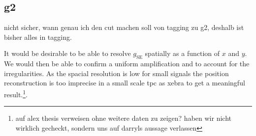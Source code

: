 
\FloatBarrier
\subsection{g2}
\label{ssec:g2}
\FloatBarrier

nicht sicher, wann genau ich den cut machen soll von tagging zu g2, deshalb ist bisher alles in tagging.



It would be desirable to be able to resolve $ g_\mathrm{SE} $ spatially as a function of $ x $ and $ y $.
We would then be able to confirm a uniform amplification and to account for the irregularities.
As the spacial resolution is low for small signals the position reconstruction is too imprecise in a small scale \gls{tpc} as \gls{xebra} to get a meaningful result.\footnote{auf alex thesis verweisen ohne weitere daten zu zeigen? haben wir nicht wirklich gecheckt, sondern uns auf darryls aussage verlassen}.
